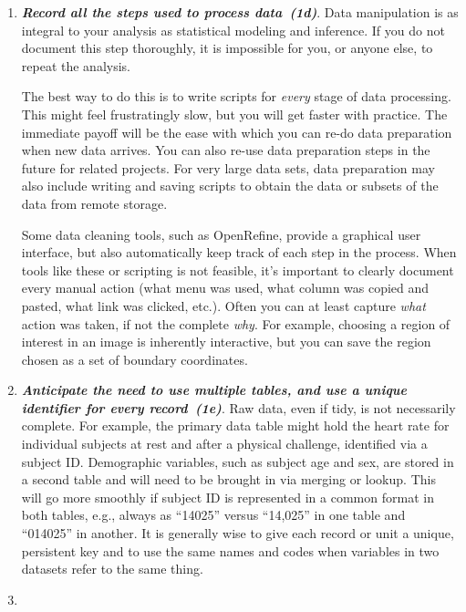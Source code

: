 \documentclass[10pt,letterpaper]{article}
\newcommand{\withurl}[2]{{#1}}
\newcommand{\practice}[2]{\textbf{\emph{{#2}~({#1})}}}
\begin{document}
\begin{enumerate}
\item

  \practice{1d}{Record all the steps used to process data}. Data
  manipulation is as integral to your analysis as statistical modeling
  and inference. If you do not document this step thoroughly, it is
  impossible for you, or anyone else, to repeat the analysis.

  The best way to do this is to write scripts for \emph{every} stage
  of data processing.  This might feel frustratingly slow, but you
  will get faster with practice. The immediate payoff will be the ease
  with which you can re-do data preparation when new data arrives. You
  can also re-use data preparation steps in the future for related
  projects. For very large data sets, data preparation may also
  include writing and saving scripts to obtain the data or subsets of
  the data from remote storage.

  Some data cleaning tools, such as
  \withurl{OpenRefine}{http://www.openrefine.org}, provide a graphical
  user interface, but also automatically keep track of each step in
  the process. When tools like these or scripting is not feasible,
  it's important to clearly document every manual action (what menu
  was used, what column was copied and pasted, what link was clicked,
  etc.).  Often you can at least capture \emph{what} action was taken,
  if not the complete \emph{why}. For example, choosing a region of
  interest in an image is inherently interactive, but you can save the
  region chosen as a set of boundary coordinates.

\item

  \practice{1e}{Anticipate the need to use multiple tables, and use a
  unique identifier for every record}. Raw data, even if tidy, is
  not necessarily complete. For example, the primary data table might
  hold the heart rate for individual subjects at rest and after a
  physical challenge, identified via a subject ID.  Demographic
  variables, such as subject age and sex, are stored in a second table
  and will need to be brought in via merging or lookup. This will go
  more smoothly if subject ID is represented in a common format in
  both tables, e.g., always as ``14025'' versus ``14,025'' in one
  table and ``014025'' in another. It is generally wise to give each
  record or unit a unique, persistent key and to use the same names
  and codes when variables in two datasets refer to the same thing.

\item


\end{enumerate}
\end{document}
